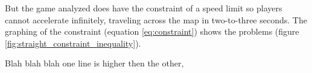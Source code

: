 But the game analyzed does have the constraint of a speed limit so players cannot accelerate infinitely, traveling across the map in two-to-three seconds. The graphing of the constraint (equation \ref{eq:constraint}) shows the problems (figure \ref{fig:straight_constraint_inequality}).



Blah blah blah one line is higher then the other,








